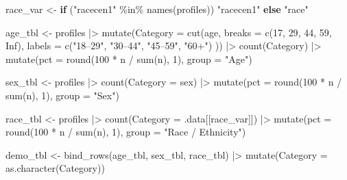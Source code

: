 \documentclass[
  letterpaper,
  DIV=11,
  numbers=noendperiod]{scrartcl}
\newenvironment{Shaded}{\begin{snugshade}}{\end{snugshade}}
\newcommand{\AttributeTok}[1]{\textcolor[rgb]{0.40,0.45,0.13}{#1}}
\newcommand{\ConstantTok}[1]{\textcolor[rgb]{0.56,0.35,0.01}{#1}}
\newcommand{\ControlFlowTok}[1]{\textcolor[rgb]{0.00,0.23,0.31}{\textbf{#1}}}
\newcommand{\DecValTok}[1]{\textcolor[rgb]{0.68,0.00,0.00}{#1}}
\newcommand{\FunctionTok}[1]{\textcolor[rgb]{0.28,0.35,0.67}{#1}}
\newcommand{\NormalTok}[1]{\textcolor[rgb]{0.00,0.23,0.31}{#1}}
\newcommand{\OtherTok}[1]{\textcolor[rgb]{0.00,0.23,0.31}{#1}}
\newcommand{\SpecialCharTok}[1]{\textcolor[rgb]{0.37,0.37,0.37}{#1}}
\newcommand{\StringTok}[1]{\textcolor[rgb]{0.13,0.47,0.30}{#1}}
\begin{document}
\begin{Shaded}
\begin{Highlighting}[]
\NormalTok{race\_var }\OtherTok{\textless{}{-}} \ControlFlowTok{if}\NormalTok{ (}\StringTok{"racecen1"} \SpecialCharTok{\%in\%} \FunctionTok{names}\NormalTok{(profiles)) }\StringTok{"racecen1"} \ControlFlowTok{else} \StringTok{"race"}

\NormalTok{age\_tbl }\OtherTok{\textless{}{-}}\NormalTok{ profiles }\SpecialCharTok{|\textgreater{}}
  \FunctionTok{mutate}\NormalTok{(}\AttributeTok{Category =} \FunctionTok{cut}\NormalTok{(age,}
    \AttributeTok{breaks =} \FunctionTok{c}\NormalTok{(}\DecValTok{17}\NormalTok{, }\DecValTok{29}\NormalTok{, }\DecValTok{44}\NormalTok{, }\DecValTok{59}\NormalTok{, }\ConstantTok{Inf}\NormalTok{),}
    \AttributeTok{labels =} \FunctionTok{c}\NormalTok{(}\StringTok{"18–29"}\NormalTok{, }\StringTok{"30–44"}\NormalTok{, }\StringTok{"45–59"}\NormalTok{, }\StringTok{"60+"}\NormalTok{)}
\NormalTok{  )) }\SpecialCharTok{|\textgreater{}}
  \FunctionTok{count}\NormalTok{(Category) }\SpecialCharTok{|\textgreater{}}
  \FunctionTok{mutate}\NormalTok{(}\AttributeTok{pct =} \FunctionTok{round}\NormalTok{(}\DecValTok{100} \SpecialCharTok{*}\NormalTok{ n }\SpecialCharTok{/} \FunctionTok{sum}\NormalTok{(n), }\DecValTok{1}\NormalTok{), }\AttributeTok{group =} \StringTok{"Age"}\NormalTok{)}

\NormalTok{sex\_tbl }\OtherTok{\textless{}{-}}\NormalTok{ profiles }\SpecialCharTok{|\textgreater{}}
  \FunctionTok{count}\NormalTok{(}\AttributeTok{Category =}\NormalTok{ sex) }\SpecialCharTok{|\textgreater{}}
  \FunctionTok{mutate}\NormalTok{(}\AttributeTok{pct =} \FunctionTok{round}\NormalTok{(}\DecValTok{100} \SpecialCharTok{*}\NormalTok{ n }\SpecialCharTok{/} \FunctionTok{sum}\NormalTok{(n), }\DecValTok{1}\NormalTok{), }\AttributeTok{group =} \StringTok{"Sex"}\NormalTok{)}

\NormalTok{race\_tbl }\OtherTok{\textless{}{-}}\NormalTok{ profiles }\SpecialCharTok{|\textgreater{}}
  \FunctionTok{count}\NormalTok{(}\AttributeTok{Category =}\NormalTok{ .data[[race\_var]]) }\SpecialCharTok{|\textgreater{}}
  \FunctionTok{mutate}\NormalTok{(}\AttributeTok{pct =} \FunctionTok{round}\NormalTok{(}\DecValTok{100} \SpecialCharTok{*}\NormalTok{ n }\SpecialCharTok{/} \FunctionTok{sum}\NormalTok{(n), }\DecValTok{1}\NormalTok{), }\AttributeTok{group =} \StringTok{"Race / Ethnicity"}\NormalTok{)}

\NormalTok{demo\_tbl }\OtherTok{\textless{}{-}} \FunctionTok{bind\_rows}\NormalTok{(age\_tbl, sex\_tbl, race\_tbl) }\SpecialCharTok{|\textgreater{}}
  \FunctionTok{mutate}\NormalTok{(}\AttributeTok{Category =} \FunctionTok{as.character}\NormalTok{(Category))}


\end{Highlighting}
\end{Shaded}
\end{document}
